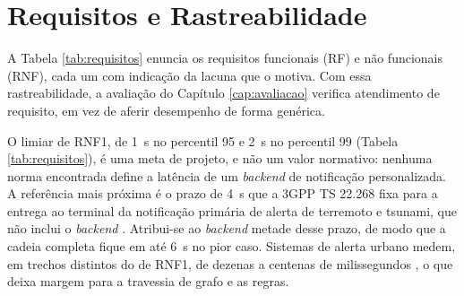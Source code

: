 \section{Requisitos e Rastreabilidade}
\label{sec:requisitos}

A Tabela \ref{tab:requisitos} enuncia os requisitos funcionais (RF) e não funcionais (RNF), cada um com indicação da lacuna que o motiva. Com essa rastreabilidade, a avaliação do Capítulo \ref{cap:avaliacao} verifica atendimento de requisito, em vez de aferir desempenho de forma genérica.

O limiar de RNF1, de 1~s no percentil 95 e 2~s no percentil 99 (Tabela \ref{tab:requisitos}), é uma meta de projeto, e não um valor normativo: nenhuma norma encontrada define a latência de um \textit{backend} de notificação personalizada. A referência mais próxima é o prazo de 4~s que a 3GPP TS 22.268 fixa para a entrega ao terminal da notificação primária de alerta de terremoto e tsunami, que não inclui o \textit{backend} \cite{etsi2026ts122268}. Atribui-se ao \textit{backend} metade desse prazo, de modo que a cadeia completa fique em até 6~s no pior caso. Sistemas de alerta urbano medem, em trechos distintos do de RNF1, de dezenas a centenas de milissegundos \cite{maltezos2022smart,zhang2025developing}, o que deixa margem para a travessia de grafo e as regras.

